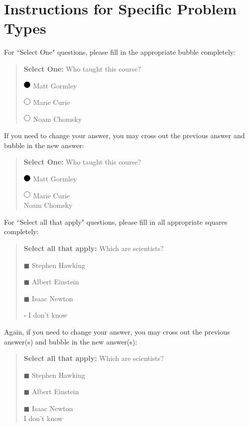 \documentclass[11pt]{exam}
\numberwithin{equation}{section} %
\numberwithin{figure}{section} %
\numberwithin{table}{section} %
\newcommand{\blackcircle}{\tikz\draw[black,fill=black] (0,0) circle (1ex);}
\renewcommand{\circle}{\tikz\draw[black] (0,0) circle (1ex);}
\begin{document}
\clearpage

\section*{Instructions for Specific Problem Types}

For ``Select One" questions, please fill in the appropriate bubble completely:

\begin{quote}
\textbf{Select One:} Who taught this course?
\begin{list}{}
     \item $\blackcircle$ Matt Gormley
     \item $\circle$ Marie Curie
     \item $\circle$ Noam Chomsky
\end{list}
\end{quote}

If you need to change your answer, you may cross out the previous answer and bubble in the new answer:

\begin{quote}
\textbf{Select One:} Who taught this course?
\begin{list}{}
     \item $\blackcircle$ Matt Gormley
     \item $\circle$ Marie Curie\\
     \xcancel{$\blackcircle$}{} Noam Chomsky
\end{list}
\end{quote}


For ``Select all that apply" questions, please fill in all appropriate squares completely:

\begin{quote}
\textbf{Select all that apply:} Which are scientists?
    \begin{list}{}
    \item $\blacksquare$ Stephen Hawking 
    \item $\blacksquare$ Albert Einstein
    \item $\blacksquare$ Isaac Newton
    \item $\square$ I don't know
\end{list}
\end{quote}

Again, if you need to change your answer, you may cross out the previous answer(s) and bubble in the new answer(s):

\begin{quote}
\textbf{Select all that apply:} Which are scientists?
    \begin{list}{}
    \item $\blacksquare$ Stephen Hawking 
    \item $\blacksquare$ Albert Einstein
    \item $\blacksquare$ Isaac Newton\\
    \xcancel{$\blacksquare$} I don't know
\end{list}
\end{quote}
\end{document}
